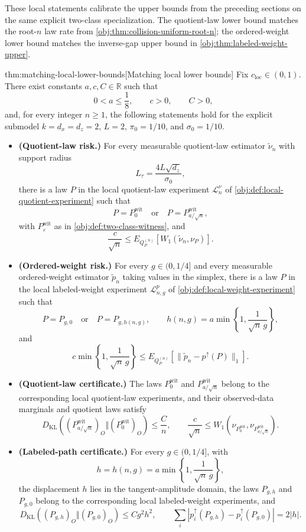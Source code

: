 These local statements calibrate the upper bounds from the preceding sections on the same explicit two-class specialization. The quotient-law lower bound matches the root-\(n\) law rate from \cref{obj:thm:collision-uniform-root-n}; the ordered-weight lower bound matches the inverse-gap upper bound in \cref{obj:thm:labeled-weight-upper}.

\begin{theoremv}{thm:matching-local-lower-bounds}[Matching local lower bounds]
Fix \(c_{\mathrm{loc}}\in(0,1)\). There exist constants \(a,c,C\in\mathbb R\) such that
\[
0<a\le \frac18,\qquad c>0,\qquad C>0,
\]
and, for every integer \(n\ge 1\), the following statements hold for the explicit submodel \(k=d_x=d_z=2\), \(L=2\), \(\pi_0=1/10\), and \(\sigma_0=1/10\).
\begin{itemize}
\item \textbf{(Quotient-law risk.)} For every measurable quotient-law estimator \(\widetilde\nu_n\) with support radius
\[
L_\tau=\frac{4L\sqrt{d_z}}{\sigma_0},
\]
there is a law \(P\) in the local quotient-law experiment \(\mathcal L_n^\nu\) of \cref{obj:def:local-quotient-experiment} such that
\[
P=P_0^{\mathrm{wit}}
\quad\text{or}\quad
P=P_{a/\sqrt n}^{\mathrm{wit}},
\]
with \(P_\varepsilon^{\mathrm{wit}}\) as in \cref{obj:def:two-class-witness}, and
\[
\frac{c}{\sqrt n}
\le
E_{Q_P^{(n)}}\!\left[W_1(\widetilde\nu_n,\nu_P)\right].
\]

\item \textbf{(Ordered-weight risk.)} For every \(g\in(0,1/4]\) and every measurable ordered-weight estimator \(\widetilde p_n\) taking values in the simplex, there is a law \(P\) in the local labeled-weight experiment \(\mathcal L_{n,g}^{p}\) of \cref{obj:def:local-weight-experiment} such that
\[
P=P_{g,0}
\quad\text{or}\quad
P=P_{g,h(n,g)},
\qquad
h(n,g)=a\min\left\{1,\frac{1}{\sqrt n\,g}\right\},
\]
and
\[
c\min\left\{1,\frac{1}{\sqrt n\,g}\right\}
\le
E_{Q_P^{(n)}}\!\left[\|\widetilde p_n-p^{\uparrow}(P)\|_1\right].
\]

\item \textbf{(Quotient-law certificate.)} The laws \(P_0^{\mathrm{wit}}\) and \(P_{a/\sqrt n}^{\mathrm{wit}}\) belong to the corresponding local quotient-law experiments, and their observed-data marginals and quotient laws satisfy
\[
D_{\mathrm{KL}}\!\left((P_{a/\sqrt n}^{\mathrm{wit}})_O\Vert (P_0^{\mathrm{wit}})_O\right)
\le
\frac{C}{n},
\qquad
\frac{c}{\sqrt n}
\le
W_1\!\left(\nu_{P_0^{\mathrm{wit}}},\nu_{P_{a/\sqrt n}^{\mathrm{wit}}}\right).
\]

\item \textbf{(Labeled-path certificate.)} For every \(g\in(0,1/4]\), with
\[
h=h(n,g)=a\min\left\{1,\frac{1}{\sqrt n\,g}\right\},
\]
the displacement \(h\) lies in the tangent-amplitude domain, the laws \(P_{g,h}\) and \(P_{g,0}\) belong to the corresponding local labeled-weight experiments, and
\[
D_{\mathrm{KL}}\!\left((P_{g,h})_O\Vert (P_{g,0})_O\right)
\le
C g^2h^2,
\qquad
\sum_i\left|p_i^{\uparrow}(P_{g,h})-p_i^{\uparrow}(P_{g,0})\right|
=
2|h|.
\]
\end{itemize}
\end{theoremv}

